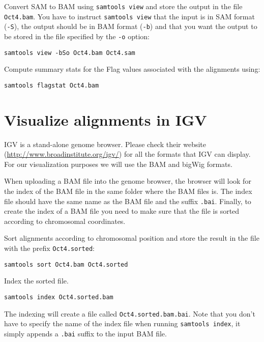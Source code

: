 \begin{steps}
Convert SAM to BAM using \texttt{samtools view} and store the output in the file
\texttt{Oct4.bam}. You have to instruct \texttt{samtools view} that the input is in SAM
format (\texttt{-S}), the output should be in BAM format (\texttt{-b}) and that
you want the output to be stored in the file specified by the \texttt{-o}
option:

\begin{lstlisting}
samtools view -bSo Oct4.bam Oct4.sam
\end{lstlisting}
\end{steps}

\begin{advanced}
Compute summary stats for the Flag values associated with the alignments using:

\begin{lstlisting}
samtools flagstat Oct4.bam
\end{lstlisting}
\end{advanced}

\section{Visualize alignments in IGV}

\begin{information}
IGV is a stand-alone genome browser. Please check their website
(\url{http://www.broadinstitute.org/igv/}) for all the formats that IGV
can display. For our visualization purposes we will use the BAM and bigWig
formats.
\end{information}

\begin{note}
When uploading a BAM file into the genome browser, the browser will look for the
index of the BAM file in the same folder where the BAM files is. The index file
should have the same name as the BAM file and the suffix \texttt{.bai}. Finally, to
create the index of a BAM file you need to make sure that the file is sorted
according to chromosomal coordinates.
\end{note}

\begin{steps}
Sort alignments according to chromosomal position and store the result in the
file with the prefix \texttt{Oct4.sorted}:

\begin{lstlisting}
samtools sort Oct4.bam Oct4.sorted
\end{lstlisting}

Index the sorted file.

\begin{lstlisting}
samtools index Oct4.sorted.bam
\end{lstlisting}

The indexing will create a file called \texttt{Oct4.sorted.bam.bai}. Note that
you don't have to specify the name of the index file when running
\texttt{samtools index}, it simply appends a \texttt{.bai} suffix to the input
BAM file.
\end{steps}


